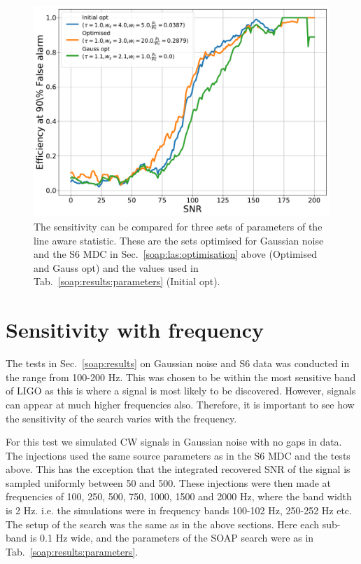 \begin{figure}[h]
	\centering
	\includegraphics[width=0.9\linewidth]{C3_soap/optimised_comparison.pdf}
	\caption[Comparison of three sets of parameters of the line aware statistic.]{The sensitivity can be compared for three sets of parameters of the line aware statistic. These are the sets optimised for Gaussian noise and the S6 \gls{MDC} in Sec.~\ref{soap:las:optimisation} above (Optimised and Gauss opt) and the values used in Tab.~\ref{soap:results:parameters} (Initial opt). }
	\label{soap:las:optimisation:comparison}
\end{figure}


\clearpage

\section{\label{soap:sensfreq}Sensitivity with frequency}

The tests in Sec.~\ref{soap:results} on Gaussian noise and S6 data was conducted in the range from 100-200 Hz.
This was chosen to be within the most sensitive band of \gls{LIGO} as this is where a signal is most likely to be discovered.
However, signals can appear at much higher frequencies also.
Therefore, it is important to see how the sensitivity of the search varies with the frequency.
 
For this test we simulated \gls{CW} signals in Gaussian noise with no gaps in data. 
The injections used the same source parameters as in the S6 \gls{MDC} \citep{walsh2016ComparisonMethods} and the tests above. 
This has the exception that the integrated recovered \gls{SNR} of the signal is sampled uniformly between 50 and 500. 
These injections were then made at frequencies of 100, 250, 500, 750, 1000, 1500 and 2000 Hz, where the band width is 2 Hz. i.e. the simulations were in frequency bands 100-102 Hz, 250-252 Hz etc.
The setup of the search was the same as in the above sections. 
Here each sub-band is 0.1 Hz wide, and the parameters of the SOAP search were as in Tab.~\ref{soap:results:parameters}.


